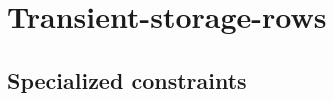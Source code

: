 \section{Transient-storage-rows}
\subsection{Specialized constraints \lispDone{}}         \label{hub: transient storage: specialized constraints}    

